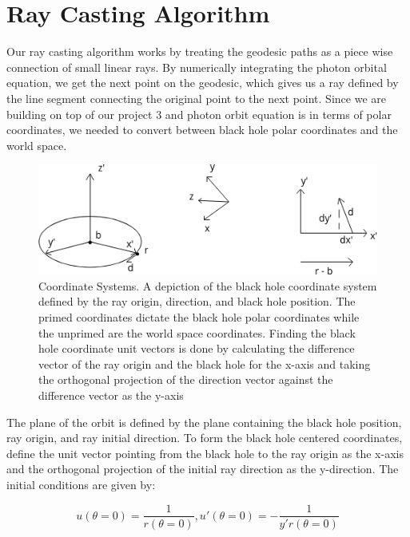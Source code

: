 \documentclass[sigconf]{acmart}
\begin{document}
\section{Ray Casting Algorithm}

Our ray casting algorithm works by treating the geodesic paths as a piece wise connection of small linear rays. By numerically integrating the photon orbital equation, we get the next point on the geodesic, which gives us a ray defined by the line segment connecting the original point to the next point. Since we are building on top of our project 3\cite{ng_ragan-kelley} and photon orbit equation is in terms of polar coordinates, we needed to convert between black hole polar coordinates and the world space.

\begin{figure}[h]
  \centering
  \includegraphics[width=\linewidth]{coord.png}
  \caption{Coordinate Systems.  A depiction of the black hole coordinate system defined by the ray origin, direction, and black hole position.  The primed coordinates dictate the black hole polar coordinates while the unprimed are the world space coordinates.  Finding the black hole coordinate unit vectors is done by calculating the difference vector of the ray origin and the black hole for the x-axis and taking the orthogonal projection of the direction vector against the difference vector as the y-axis}
\end{figure}

The plane of the orbit is defined by the plane containing the black hole position, ray origin, and ray initial direction.  To form the black hole centered coordinates, define the unit vector pointing from the black hole to the ray origin as the x-axis and the orthogonal projection of the initial ray direction as the y-direction.  The initial conditions are given by:

\begin{displaymath}
  u(\theta = 0) = \frac{1}{r(\theta = 0)},
  u'(\theta = 0) = -\frac{1}{y'r(\theta = 0)}
\end{displaymath}
\end{document}
